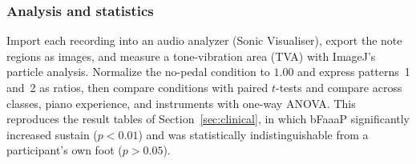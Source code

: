 \subsubsection{Analysis and statistics}
\label{sec:impl-apee-analysis}
Import each recording into an audio analyzer (Sonic Visualiser), export the
note regions as images, and measure a tone-vibration area (TVA) with ImageJ's
particle analysis. Normalize the no-pedal condition to $1.00$ and express
patterns~1 and~2 as ratios, then compare conditions with paired $t$-tests and
compare across classes, piano experience, and instruments with one-way ANOVA.
This reproduces the result tables of Section~\ref{sec:clinical}, in which bFaaaP
significantly increased sustain ($p<0.01$) and was statistically
indistinguishable from a participant's own foot ($p>0.05$).
